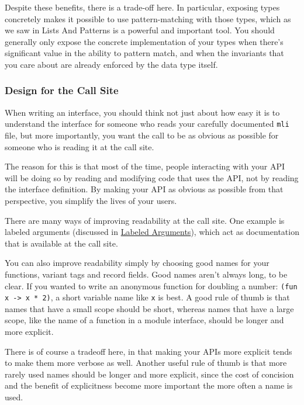 Despite these benefits, there is a trade-off here. In particular,
exposing types concretely makes it possible to use pattern-matching with
those types, which as we saw in {Lists And Patterns} is a powerful and
important tool. You should generally only expose the concrete
implementation of your types when there's significant value in the
ability to pattern match, and when the invariants that you care about
are already enforced by the data type itself.

\hypertarget{design-for-the-call-site}{%
\subsubsection{Design for the Call
Site}\label{design-for-the-call-site}}

When writing an interface, you should think not just about how easy it
is to understand the interface for someone who reads your carefully
documented \passthrough{\lstinline!mli!} file, but more importantly, you
want the call to be as obvious as possible for someone who is reading it
at the call site.

The reason for this is that most of the time, people interacting with
your API will be doing so by reading and modifying code that uses the
API, not by reading the interface definition. By making your API as
obvious as possible from that perspective, you simplify the lives of
your users.

There are many ways of improving readability at the call site. One
example is labeled arguments (discussed in
\href{variables-and-functions.html\#labeled-arguments}{Labeled
Arguments}), which act as documentation that is available at the call
site.

You can also improve readability simply by choosing good names for your
functions, variant tags and record fields. Good names aren't always
long, to be clear. If you wanted to write an anonymous function for
doubling a number: \passthrough{\lstinline!(fun x -> x * 2)!}, a short
variable name like \passthrough{\lstinline!x!} is best. A good rule of
thumb is that names that have a small scope should be short, whereas
names that have a large scope, like the name of a function in a module
interface, should be longer and more explicit.

There is of course a tradeoff here, in that making your APIs more
explicit tends to make them more verbose as well. Another useful rule of
thumb is that more rarely used names should be longer and more explicit,
since the cost of concision and the benefit of explicitness become more
important the more often a name is used.

